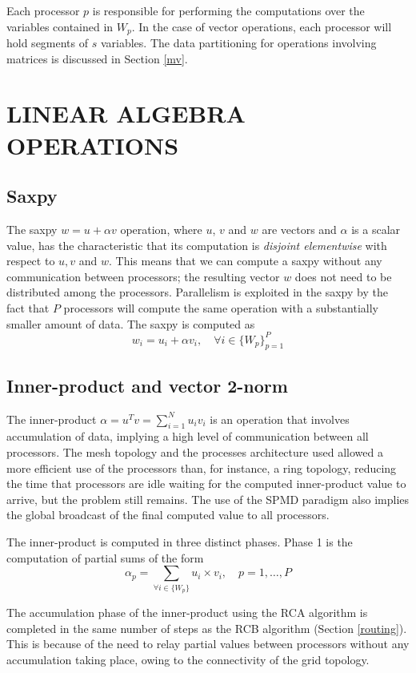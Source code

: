 \documentclass{ecai}
\begin{document}
Each processor $p$ is responsible for performing the computations over
the variables contained in $W_{p}$. In the case of vector operations,
each processor will hold segments of $s$ variables. The data
partitioning for operations involving matrices is discussed in Section
\ref{mv}.
\section{LINEAR ALGEBRA OPERATIONS}
\label{blas}
\subsection{Saxpy}
\label{saxpy}
The saxpy $w=u+\alpha v$ operation, where $u$, $v$ and $w$ are vectors
and $\alpha$ is a scalar value, has the characteristic that its
computation is \emph{disjoint elementwise} with respect to $u, v$ and
$w$. This means that we can compute a saxpy without any communication
between processors; the resulting vector $w$ does not need to be
distributed among the processors. Parallelism is exploited in the
saxpy by the fact that $P$ processors will compute the same operation
with a substantially smaller amount of data. The saxpy is computed as
\begin{equation}
w_{i}=u_{i}+\alpha v_{i},\quad \forall i\in\{W_{p}\}_{p=1}^{P}
\label{distsaxpy}
\end{equation}
\subsection{Inner-product and vector 2-norm}
\label{utv}
The inner-product $\alpha=u^{T}v=\sum_{i=1}^{N}{u_{i}v_{i}}$ is an
operation that involves accumulation of data, implying a high level of
communication between all processors. The mesh topology and the
processes architecture used allowed a more efficient use of the
processors than, for instance, a ring topology, reducing the time that
processors are idle waiting for the computed inner-product value to
arrive, but the problem still remains. The use of the SPMD paradigm
also implies the global broadcast of the final computed value to all
processors.

The inner-product is computed in three distinct phases. Phase 1 is the
computation of partial sums of the form
\begin{equation}
\alpha_{p}=\sum_{\forall i\in\{W_{p}\}}{u_{i}\times v_{i}},\quad p=1,\ldots,P
\label{distutv}
\end{equation}

The accumulation phase of the inner-product using the RCA algorithm is
completed in the same number of steps as the RCB algorithm (Section
\ref{routing}). This is because of the need to relay partial values
between processors without any accumulation taking place, owing to the
connectivity of the grid topology.
\end{document}
